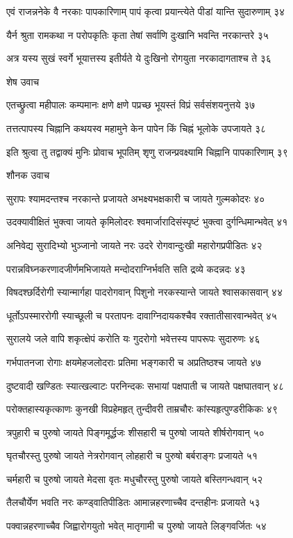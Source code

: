 एवं राजन्ननेके वै नरकाः पापकारिणाम्
पापं कृत्वा प्रयान्त्येते पीडां यान्ति सुदारुणाम् ३४

यैर्न श्रुता रामकथा न परोपकृतिः कृता
तेषां सर्वाणि दुःखानि भवन्ति नरकान्तरे ३५

अत्र यस्य सुखं स्वर्गे भूयात्तस्य इतीर्यते
ये दुःखिनो रोगयुता नरकादागताश्च ते ३६

शेष उवाच

एतच्छ्रुत्वा महीपालः कम्पमानः क्षणे क्षणे
पप्रच्छ भूयस्तं विप्रं सर्वसंशयनुत्तये ३७

तत्तत्पापस्य चिह्नानि कथयस्व महामुने
केन पापेन किं चिह्नं भूलोके उपजायते ३८

इति श्रुत्वा तु तद्वाक्यं मुनिः प्रोवाच भूपतिम्
शृणु राजन्प्रवक्ष्यामि चिह्नानि पापकारिणाम् ३९

शौनक उवाच

सुरापः श्यामदन्तश्च नरकान्ते प्रजायते
अभक्ष्यभक्षकारी च जायते गुल्मकोदरः ४०

उदक्यावीक्षितं भुक्त्वा जायते कृमिलोदरः
श्वमार्जारादिसंस्पृष्टं भुक्त्वा दुर्गन्धिमान्भवेत् ४१

अनिवेद्य सुरादिभ्यो भुञ्जानो जायते नरः
उदरे रोगवान्दुःखी महारोगप्रपीडितः ४२

परान्नविघ्नकरणादजीर्णमभिजायते
मन्दोदराग्निर्भवति सति द्रव्ये कदन्नदः ४३

विषदश्छर्दिरोगी स्यान्मार्गहा पादरोगवान्
पिशुनो नरकस्यान्ते जायते श्वासकासवान् ४४

धूर्तोऽपस्माररोगी स्याच्छूली च परतापनः
दावाग्निदायकश्चैव रक्तातीसारवान्भवेत् ४५

सुरालये जले वापि शकृत्क्षेपं करोति यः
गुदरोगो भवेत्तस्य पापरूपः सुदारुणः ४६

गर्भपातनजा रोगाः क्षयमेहजलोदराः
प्रतिमा भङ्गकारी च अप्रतिष्ठश्च जायते ४७

दुष्टवादी खण्डितः स्यात्खल्वाटः परनिन्दकः
सभायां पक्षपाती च जायते पक्षघातवान् ४८

परोक्तहास्यकृत्काणः कुनखी विप्रहेमहृत्
तुन्दीवरी ताम्रचौरः कांस्यहृत्पुण्डरीकिकः ४९

त्रपुहारी च पुरुषो जायते पिङ्गमूर्द्धजः
शीसहारी च पुरुषो जायते शीर्षरोगवान् ५०

घृतचौरस्तु पुरुषो जायते नेत्ररोगवान्
लोहहारी च पुरुषो बर्बराङ्गः प्रजायते ५१

चर्महारी च पुरुषो जायते मेदसा वृतः
मधुचौरस्तु पुरुषो जायते बस्तिगन्धवान् ५२

तैलचौर्येण भवति नरः कण्ड्वातिपीडितः
आमान्नहरणाच्चैव दन्तहीनः प्रजायते ५३

पक्वान्नहरणाच्चैव जिह्वारोगयुतो भवेत्
मातृगामी च पुरुषो जायते लिङ्गवर्जितः ५४

